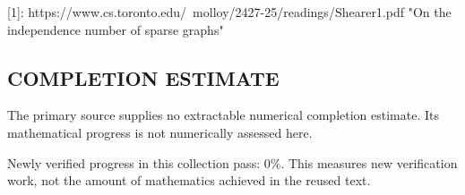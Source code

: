 [1]: https://www.cs.toronto.edu/~molloy/2427-25/readings/Shearer1.pdf "On the independence number of sparse graphs"


\subsection*{COMPLETION ESTIMATE}
The primary source supplies no extractable numerical completion estimate. Its mathematical progress is not numerically assessed here.

Newly verified progress in this collection pass: $0\%$. This measures new verification work, not the amount of mathematics achieved in the reused text.
